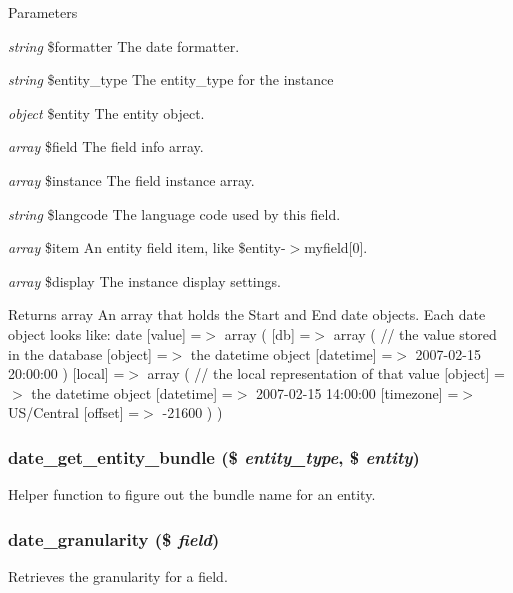 \begin{DoxyParams}{Parameters}
\item[{\em string}]\$formatter The date formatter. \item[{\em string}]\$entity\_\-type The entity\_\-type for the instance \item[{\em object}]\$entity The entity object. \item[{\em array}]\$field The field info array. \item[{\em array}]\$instance The field instance array. \item[{\em string}]\$langcode The language code used by this field. \item[{\em array}]\$item An entity field item, like \$entity-\/$>$myfield\mbox{[}0\mbox{]}. \item[{\em array}]\$display The instance display settings.\end{DoxyParams}
\begin{DoxyReturn}{Returns}
array An array that holds the Start and End date objects. Each date object looks like: date \mbox{[}value\mbox{]} =$>$ array ( \mbox{[}db\mbox{]} =$>$ array ( // the value stored in the database \mbox{[}object\mbox{]} =$>$ the datetime object \mbox{[}datetime\mbox{]} =$>$ 2007-\/02-\/15 20:00:00 ) \mbox{[}local\mbox{]} =$>$ array ( // the local representation of that value \mbox{[}object\mbox{]} =$>$ the datetime object \mbox{[}datetime\mbox{]} =$>$ 2007-\/02-\/15 14:00:00 \mbox{[}timezone\mbox{]} =$>$ US/Central \mbox{[}offset\mbox{]} =$>$ -\/21600 ) ) 
\end{DoxyReturn}
\hypertarget{date_8module_a6ae854a04f35eae5dc91b242802728d0}{
\subsubsection[{date\_\-get\_\-entity\_\-bundle}]{\setlength{\rightskip}{0pt plus 5cm}date\_\-get\_\-entity\_\-bundle (\$ {\em entity\_\-type}, \/  \$ {\em entity})}}
\label{date_8module_a6ae854a04f35eae5dc91b242802728d0}
Helper function to figure out the bundle name for an entity. \hypertarget{date_8module_a524c8837d65b4e1b512a7ea3ae33d016}{
\subsubsection[{date\_\-granularity}]{\setlength{\rightskip}{0pt plus 5cm}date\_\-granularity (\$ {\em field})}}
\label{date_8module_a524c8837d65b4e1b512a7ea3ae33d016}
Retrieves the granularity for a field.

